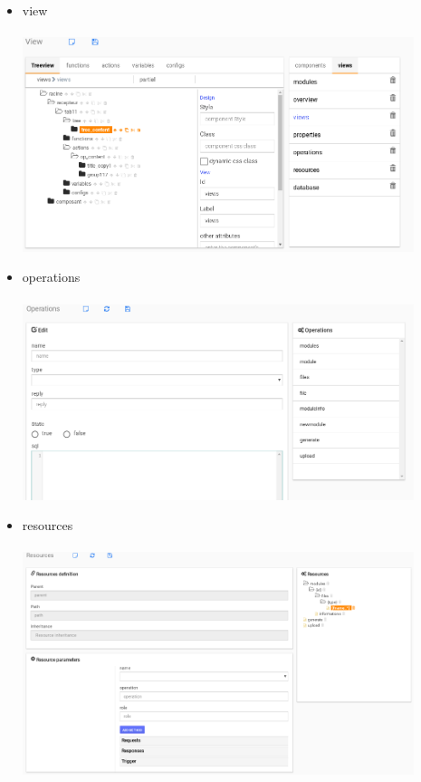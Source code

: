 \documentclass[a4paper,11pt]{report}
\begin{document}
\begin{itemize}

 \item view \\
 \\
 \includegraphics [width=0.90\textwidth] {./images/view.png}
 
  \item operations \\
 \\
 \includegraphics [width=0.90\textwidth] {./images/operations.png}
 
 \item resources \\
 \\
 \includegraphics [width=0.90\textwidth] {./images/resources.png}
 
\end{itemize}
\end{document}
